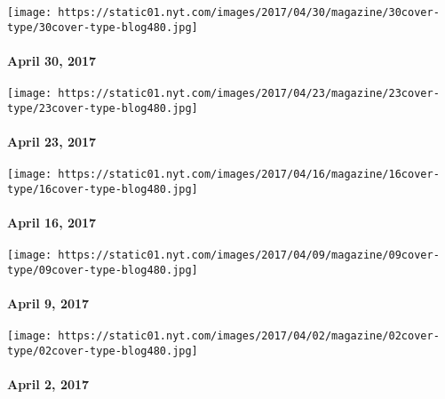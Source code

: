 \href{https://www.nytimes.com/issue/magazine/2017/04/28/magazine-index-20170430}{}

\texttt{[image: https://static01.nyt.com/images/2017/04/30/magazine/30cover-type/30cover-type-blog480.jpg]}

\hypertarget{april-30-2017}{%
\paragraph{April 30, 2017}\label{april-30-2017}}

\href{https://www.nytimes.com/issue/magazine/2017/04/21/magazine-index-20170423}{}

\texttt{[image: https://static01.nyt.com/images/2017/04/23/magazine/23cover-type/23cover-type-blog480.jpg]}

\hypertarget{april-23-2017}{%
\paragraph{April 23, 2017}\label{april-23-2017}}

\href{https://www.nytimes.com/issue/magazine/2017/04/14/magazine-index-20170416}{}

\texttt{[image: https://static01.nyt.com/images/2017/04/16/magazine/16cover-type/16cover-type-blog480.jpg]}

\hypertarget{april-16-2017}{%
\paragraph{April 16, 2017}\label{april-16-2017}}

\href{https://www.nytimes.com/issue/magazine/2017/04/07/magazine-index-20170409}{}

\texttt{[image: https://static01.nyt.com/images/2017/04/09/magazine/09cover-type/09cover-type-blog480.jpg]}

\hypertarget{april-9-2017}{%
\paragraph{April 9, 2017}\label{april-9-2017}}

\href{https://www.nytimes.com/issue/magazine/2017/03/31/magazine-index-20170402}{}

\texttt{[image: https://static01.nyt.com/images/2017/04/02/magazine/02cover-type/02cover-type-blog480.jpg]}

\hypertarget{april-2-2017}{%
\paragraph{April 2, 2017}\label{april-2-2017}}

